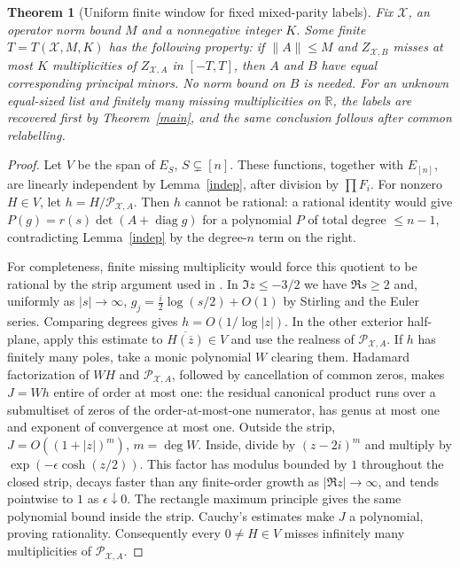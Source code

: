 \documentclass[11pt]{article}
\newtheorem{theorem}{Theorem}[section]
\newcommand{\RR}{\mathbb R}
\newcommand{\diag}{\operatorname{diag}}
\newcommand{\cX}{\mathcal X}
\newcommand{\PP}{\mathcal P}
\begin{document}
\begin{theorem}[Uniform finite window for fixed mixed-parity labels]\label{finite}
Fix $\cX$, an operator norm bound $M$ and a nonnegative integer $K$. Some finite $T=T(\cX,M,K)$ has the following property: if $\|A\|\le M$ and $Z_{\cX,B}$ misses at most $K$ multiplicities of $Z_{\cX,A}$ in $[-T,T]$, then $A$ and $B$ have equal corresponding principal minors. No norm bound on $B$ is needed. For an unknown equal-sized list and finitely many missing multiplicities on $\RR$, the labels are recovered first by Theorem~\ref{main}, and the same conclusion follows after common relabelling.
\end{theorem}
\begin{proof}
Let $V$ be the span of $E_S$, $S\subsetneq[n]$. These functions, together with $E_{[n]}$, are linearly independent by Lemma~\ref{indep}, after division by $\prod F_i$. For nonzero $H\in V$, let $h=H/\PP_{\cX,A}$. Then $h$ cannot be rational: a rational identity would give
$P(g)=r(s)\det(A+\diag g)$ for a polynomial $P$ of total degree $\le n-1$, contradicting Lemma~\ref{indep} by the degree-$n$ term on the right.

For completeness, finite missing multiplicity would force this quotient to be rational by the strip argument used in \cite{repo}. In $\Im z\le-3/2$ we have $\Re s\ge2$ and, uniformly as $|s|\to\infty$, $g_j=\frac i2\log(s/2)+O(1)$ by Stirling and the Euler series. Comparing degrees gives $h=O(1/\log |z|)$. In the other exterior half-plane, apply this estimate to $\overline{H(\overline z)}\in V$ and use the realness of $\PP_{\cX,A}$. If $h$ has finitely many poles, take a monic polynomial $W$ clearing them. Hadamard factorization of $WH$ and $\PP_{\cX,A}$, followed by cancellation of common zeros, makes $J=Wh$ entire of order at most one: the residual canonical product runs over a submultiset of zeros of the order-at-most-one numerator, has genus at most one and exponent of convergence at most one. Outside the strip, $J=O((1+|z|)^m)$, $m=\deg W$. Inside, divide by $(z-2i)^m$ and multiply by $\exp(-\epsilon\cosh(z/2))$. This factor has modulus bounded by $1$ throughout the closed strip, decays faster than any finite-order growth as $|\Re z|\to\infty$, and tends pointwise to $1$ as $\epsilon\downarrow0$. The rectangle maximum principle gives the same polynomial bound inside the strip. Cauchy's estimates make $J$ a polynomial, proving rationality. Consequently every $0\ne H\in V$ misses infinitely many multiplicities of $\PP_{\cX,A}$.


\end{proof}
\end{document}
